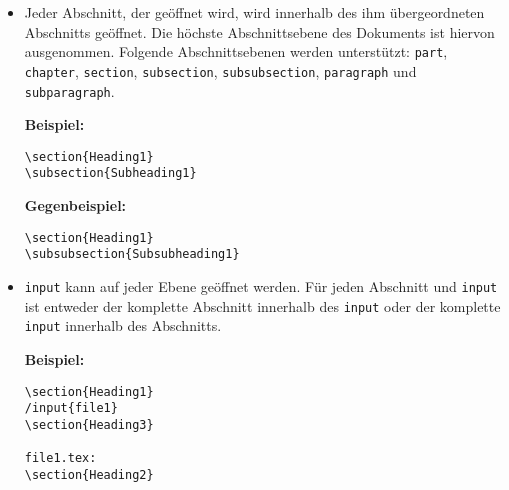 \begin{itemize}
  \item Jeder Abschnitt, der geöffnet wird, wird innerhalb des ihm übergeordneten Abschnitts geöffnet.
  Die höchste Abschnittsebene des Dokuments ist hiervon ausgenommen.
  Folgende Abschnittsebenen werden unterstützt:
  \verb|part|, \verb|chapter|, \verb|section|, \verb|subsection|, \verb|subsubsection|, \verb|paragraph| und
  \verb|subparagraph|.

  \textbf{Beispiel:}
  \begin{verbatim}
\section{Heading1}
\subsection{Subheading1}
  \end{verbatim}

  \textbf{Gegenbeispiel:}
  \begin{verbatim}
\section{Heading1}
\subsubsection{Subsubheading1}
  \end{verbatim}

  \clearpage

  \item \verb|input| kann auf jeder Ebene geöffnet werden.
  Für jeden Abschnitt und \verb|input| ist entweder der komplette Abschnitt innerhalb des \verb|input| oder der
  komplette \verb|input| innerhalb des Abschnitts.

  \textbf{Beispiel:}
  \begin{verbatim}
\section{Heading1}
/input{file1}
\section{Heading3}

file1.tex:
\section{Heading2}
  \end{verbatim}


\end{itemize}

